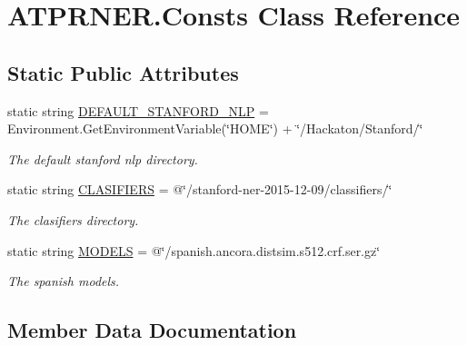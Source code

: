 \hypertarget{class_a_t_p_r_n_e_r_1_1_consts}{}\section{A\+T\+P\+R\+N\+E\+R.\+Consts Class Reference}
\label{class_a_t_p_r_n_e_r_1_1_consts}
\subsection*{Static Public Attributes}
\begin{DoxyCompactItemize}
\item 
static string \hyperlink{class_a_t_p_r_n_e_r_1_1_consts_a5552c464404a06a1cb4903e9e8a6fd19}{D\+E\+F\+A\+U\+L\+T\+\_\+\+S\+T\+A\+N\+F\+O\+R\+D\+\_\+\+N\+LP} = Environment.\+Get\+Environment\+Variable(\char`\"{}H\+O\+ME\char`\"{}) + \char`\"{}/Hackaton/Stanford/\char`\"{}
\begin{DoxyCompactList}\small\item\em The default stanford nlp directory. \end{DoxyCompactList}\item 
static string \hyperlink{class_a_t_p_r_n_e_r_1_1_consts_a2c6cdaf05bd4a84d141e3cdd19205f4d}{C\+L\+A\+S\+I\+F\+I\+E\+RS} = @\char`\"{}/stanford-\/ner-\/2015-\/12-\/09/classifiers/\char`\"{}
\begin{DoxyCompactList}\small\item\em The clasifiers directory. \end{DoxyCompactList}\item 
static string \hyperlink{class_a_t_p_r_n_e_r_1_1_consts_a2e80ccd5f9a0b20cf5ce31386604a3b2}{M\+O\+D\+E\+LS} = @\char`\"{}/spanish.\+ancora.\+distsim.\+s512.\+crf.\+ser.\+gz\char`\"{}
\begin{DoxyCompactList}\small\item\em The spanish models. \end{DoxyCompactList}\end{DoxyCompactItemize}


\subsection{Member Data Documentation}
\hypertarget{class_a_t_p_r_n_e_r_1_1_consts_a2c6cdaf05bd4a84d141e3cdd19205f4d}{}\label{class_a_t_p_r_n_e_r_1_1_consts_a2c6cdaf05bd4a84d141e3cdd19205f4d} 
